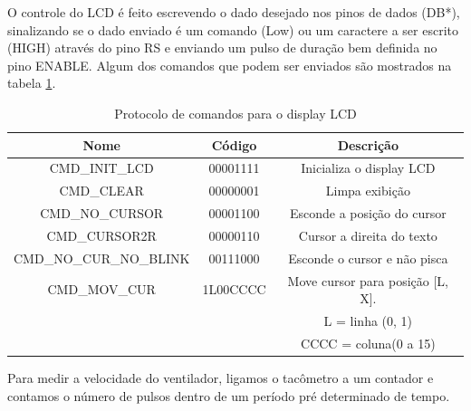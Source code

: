 \documentclass{article}
\begin{document}
O controle do LCD é feito escrevendo o dado desejado nos pinos de dados (DB*), sinalizando se o dado enviado é um comando (Low) ou um caractere a ser escrito (HIGH) através do pino RS e enviando um pulso de duração bem definida no pino ENABLE. Algum dos comandos que podem ser enviados são mostrados na tabela \ref{tab:lcd_commands}.
\begin{table}[H]
	\centering
	\caption{Protocolo de comandos para o display LCD}
	\label{tab:lcd_commands}
	\begin{tabular}{|c|c|c|}
		\hline \bfseries{Nome} & \bfseries{Código} & \bfseries{Descrição} \\
		\hline CMD\_INIT\_LCD & 00001111 & Inicializa o display LCD \\
		\hline CMD\_CLEAR & 00000001 & Limpa exibição\\
		\hline CMD\_NO\_CURSOR & 00001100 & Esconde a posição do cursor\\
		\hline CMD\_CURSOR2R & 00000110 & Cursor a direita do texto\\
		\hline CMD\_NO\_CUR\_NO\_BLINK & 00111000 & Esconde o cursor e não pisca\\
		\hline CMD\_MOV\_CUR & 1L00CCCC & Move cursor para posição [L, X].\\
			& & L = linha (0, 1)\\
			& & CCCC = coluna(0 a 15)\\
		\hline
	\end{tabular}
\end{table}

Para medir a velocidade do ventilador, ligamos o tacômetro a um contador e contamos o número de pulsos dentro de um período pré determinado de tempo.
\end{document}
